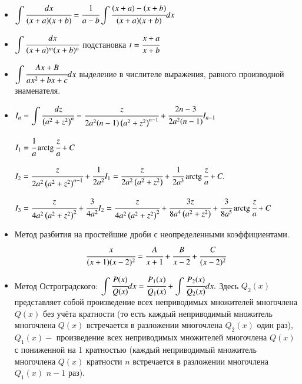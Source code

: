 \documentclass[twoside, a4paperpt]{extarticle}
\begin{document}
\begin{itemize}
    \item $ \displaystyle \int \cfrac{d x}{(x+a)(x+b)}=\cfrac{1}{a-b} \displaystyle \int \cfrac{(x+a)-(x+b)}{(x+a)(x+b)} d x $
    \item $ \displaystyle \int \cfrac{d x}{(x+a)^{m}(x+b)^{n}}$ подстановка $ t=\cfrac{x+a}{x+b} $
    \item $ \displaystyle \int \cfrac{A x+B}{a x^{2}+b x+c} d x$ выделение в числителе выражения,  равного производной знаменателя.
    \item $I_{n}=\displaystyle \int \cfrac{d z}{\left(a^{2}+z^{2}\right)^{n}} = \cfrac{z}{2 a^{2}(n-1)\left(a^{2}+z^{2}\right)^{n-1}}+\cfrac{2 n-3}{2 a^{2}(n-1)} I_{n-1}$
    
    $I_{1}=\cfrac{1}{a} \operatorname{arctg} \cfrac{z}{a}+C$
    
    $I_{2}=\cfrac{z}{2 a^{2}\left(a^{2}+z^{2}\right)^{n-1}}+\cfrac{1}{2 a^{2}} I_{1}=\cfrac{z}{2 a^{2}\left(a^{2}+z^{2}\right)}+\cfrac{1}{2 a^{3}} \operatorname{arctg} \cfrac{z}{a}+C .$
    
    $I_{3}=\cfrac{z}{4 a^{2}\left(a^{2}+z^{2}\right)^{2}}+\cfrac{3}{4 a^{2}} I_{2}=\cfrac{z}{4 a^{2}\left(a^{2}+z^{2}\right)^{2}}+\cfrac{3 z}{8 a^{4}\left(a^{2}+z^{2}\right)}+\cfrac{3}{8 a^{5}} \operatorname{arctg} \cfrac{z}{a}+C$

    \item Метод разбития на простейшие дроби с неопределенными коэффициентами.
    $$\cfrac{x}{(x+1)(x-2)^{2}}=\cfrac{A}{x+1}+\cfrac{B}{x-2}+\cfrac{C}{(x-2)^{2}}$$
    \newpage
    \item Метод Остроградского: $\displaystyle \int \cfrac{P(x)}{Q(x)} d x=\cfrac{P_{1}(x)}{Q_{1}(x)}+\displaystyle \int \cfrac{P_{2}(x)}{Q_{2}(x)} d x .$
    Здесь $Q_{2}(x)$ представляет собой произведение всех неприводимых множителей многочлена $Q(x)$ без учёта кратности (то есть каждый неприводимый множитель многочлена $Q(x)$ встречается в разложении многочлена $Q_{2}(x)$ один раз), $Q_{1}(x)-$ произведение всех неприводимых множителей многочлена $Q(x)$ с пониженной на 1 кратностью (каждый неприводимый множитель многочлена $Q(x)$ кратности $n$ встречается в разложении многочлена $Q_{1}(x)$ $n-1$ раз).
\end{itemize}
\end{document}
